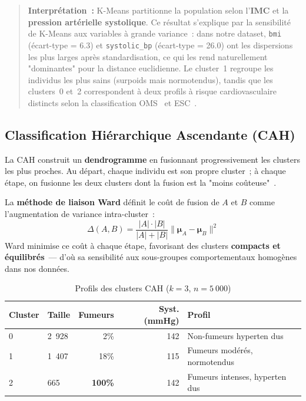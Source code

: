 \begin{quote}
\textbf{Interprétation~:} K-Means partitionne la population selon l'\textbf{IMC} et la \textbf{pression artérielle systolique}. Ce résultat s'explique par la sensibilité de K-Means aux variables à grande variance~: dans notre dataset, \texttt{bmi} (écart-type = 6.3) et \texttt{systolic\_bp} (écart-type = 26.0) ont les dispersions les plus larges après standardisation, ce qui les rend naturellement "dominantes" pour la distance euclidienne. Le cluster~1 regroupe les individus les plus sains (surpoids mais normotendus), tandis que les clusters~0 et~2 correspondent à deux profils à risque cardiovasculaire distincts selon la classification OMS~\cite{who2000} et ESC~\cite{esc2018}.
\end{quote}

\FloatBarrier

\subsection{Classification Hiérarchique Ascendante (CAH)}

La CAH construit un \textbf{dendrogramme} en fusionnant progressivement les clusters les plus proches. Au départ, chaque individu est son propre cluster~; à chaque étape, on fusionne les deux clusters dont la fusion est la "moins coûteuse"~\cite{hastie2009}.

La \textbf{méthode de liaison Ward} définit le coût de fusion de $A$ et $B$ comme l'augmentation de variance intra-cluster~:
\begin{equation}
\Delta(A, B) = \frac{|A|\cdot|B|}{|A|+|B|}\|\boldsymbol{\mu}_A - \boldsymbol{\mu}_B\|^2
\end{equation}
Ward minimise ce coût à chaque étape, favorisant des clusters \textbf{compacts et équilibrés}~--- d'où sa sensibilité aux sous-groupes comportementaux homogènes dans nos données.

\begin{table}[H]
\centering
\caption{Profils des clusters CAH ($k=3$, $n=5~000$)}
\label{tab:cah_profiles}
\begin{tabular}{llrrl}
\toprule
Cluster & Taille & Fumeurs & Syst. (mmHg) & Profil \\
\midrule
0 & 2~928 & 2\%           & 142 & Non-fumeurs hyperten dus \\
1 & 1~407 & 18\%          & 115 & Fumeurs modérés, normotendus \\
2 &   665 & \textbf{100\%}& 142 & Fumeurs intenses, hyperten dus \\
\bottomrule
\end{tabular}
\end{table}

